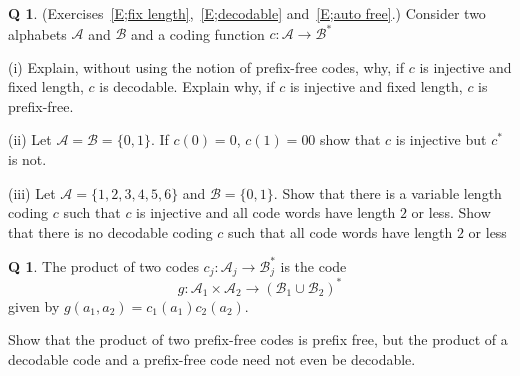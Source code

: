 \documentclass[12pt,a4paper]{article}
\theoremstyle{plain}
\theoremstyle{definition}
\newtheorem{question}[theorem]{Q}
\begin{document}
\begin{question}\label{C1.2} 
(Exercises~\ref{E;fix length},~\ref{E;decodable}
and~\ref{E;auto free}.)
Consider two alphabets ${\mathcal A}$
and ${\mathcal B}$
and a coding function $c:{\mathcal A}\rightarrow{\mathcal B}^{*}$

(i) Explain, without using the notion of prefix-free
codes, why, if $c$ is injective
and fixed length, $c$
is  decodable. Explain why, if $c$ is injective
and fixed length, $c$
is  prefix-free.

(ii) Let ${\mathcal A}={\mathcal B}=\{0,1\}$. If
$c(0)=0$, $c(1)=00$ show that $c$ is injective but $c^{*}$ is not.

(iii) Let ${\mathcal A}=\{1,2,3,4,5,6\}$ and ${\mathcal B}=\{0,1\}$.
Show that there is a variable length coding $c$ such that
$c$ is injective and all code words have length $2$ or less.
Show that there is no decodable coding $c$ such that
all code words have length $2$ or less
\end{question}
\begin{question}\label{C1.3} The product of two codes 
$c_{j}:{\mathcal A}_{j}\rightarrow{\mathcal B}^{*}_{j}$
is the code 
\[g:{\mathcal A}_{1}\times{\mathcal A}_{2}
\rightarrow({\mathcal B}_{1}\cup{\mathcal B}_{2})^{*}\]
given by
$g(a_{1},a_{2})=c_{1}(a_{1})c_{2}(a_{2})$. 

Show that the product of two prefix-free codes is prefix
free, but the product of a decodable code and a prefix-free
code need not even be decodable.
\end{question} 
\end{document}
